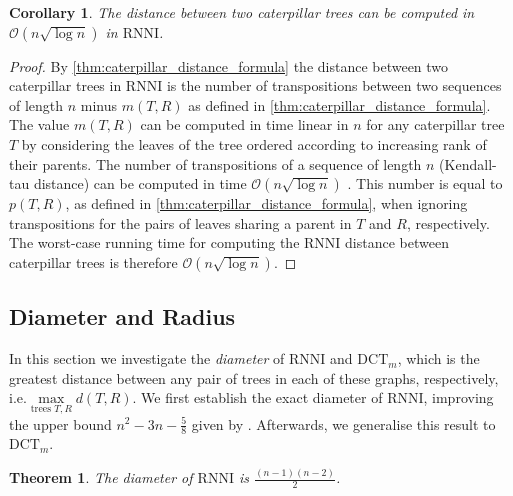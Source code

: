 \documentclass[11pt]{amsart}
\newtheorem{theorem}{Theorem}
\newtheorem{corollary}{Corollary}
\newcommand{\rnni}{\mathrm{RNNI}}
\newcommand{\dct}{\mathrm{DCT}}
\renewcommand{\O}{\mathcal O}
\newcommand{\summary}[1]{} %
\providecommand{\DIFaddtex}[1]{{\protect\color{blue}\uwave{#1}}} %
\providecommand{\DIFaddbegin}{} %
\providecommand{\DIFaddend}{} %
\providecommand{\DIFadd}[1]{\texorpdfstring{\DIFaddtex{#1}}{#1}} %
\newcommand{\DIFaddincludegraphics}[2][]{{\color{blue}\fbox{\DIFOincludegraphics[#1]{#2}}}} %
\DeclareRobustCommand{\DIFaddbegin}{\DIFOaddbegin \let\includegraphics\DIFaddincludegraphics} %
\DeclareRobustCommand{\DIFaddend}{\DIFOaddend \let\includegraphics\DIFOincludegraphics} %
\begin{document}
\begin{corollary}
	The distance between two caterpillar trees can be computed in $\O(n \sqrt{\log n})$ in $\rnni$.
	\label{cor:caterpillar_distance_rnni_nlogn}
\end{corollary}
\vspace{-0.66cm}

\begin{proof}
	By \autoref{thm:caterpillar_distance_formula} the distance between two caterpillar trees in $\rnni$ is the number of transpositions between two sequences of length $n$ minus $m(T,R)$ as defined in \autoref{thm:caterpillar_distance_formula}.
	The value $m(T,R)$ can be computed in time linear in $n$ for any caterpillar tree $T$ by considering the leaves of the tree ordered according to increasing rank of their parents.
	The number of transpositions of a sequence of length $n$ (Kendall-tau distance) can be computed in time $\O(n \sqrt{\log n})$ \autocite{Chan2010-ls}.
	This number is equal to $p(T,R)$, as defined in \autoref{thm:caterpillar_distance_formula}, when ignoring transpositions for the pairs of leaves sharing a parent in $T$ and $R$, respectively.
	The worst-case running time for computing the $\rnni$ distance between caterpillar trees is therefore $\O(n \sqrt{\log n})$.
\end{proof}

\subsection{Diameter and Radius}

\label{section:diameter}
\summary{Definition of Diameter.}
In this section we  investigate the \emph{diameter} of $\rnni$ and $\dct_m$, which is the greatest distance between any pair of trees in each of these graphs, respectively, i.e.\DIFaddbegin \DIFadd{\ }\DIFaddend $\max\limits_{\text{trees }T,R}d(T,R)$.
We first establish the exact diameter of $\rnni$, improving the upper bound $n^2 - 3n - \frac{5}{8}$ given by \textcite{Gavryushkin2018-ol}.
Afterwards, we generalise this result to $\dct_m$.

\begin{theorem}
	The diameter of $\rnni$ is $\frac{(n-1)(n-2)}{2}$.
	\label{thm:diameter_rnni}
\end{theorem}
\end{document}
